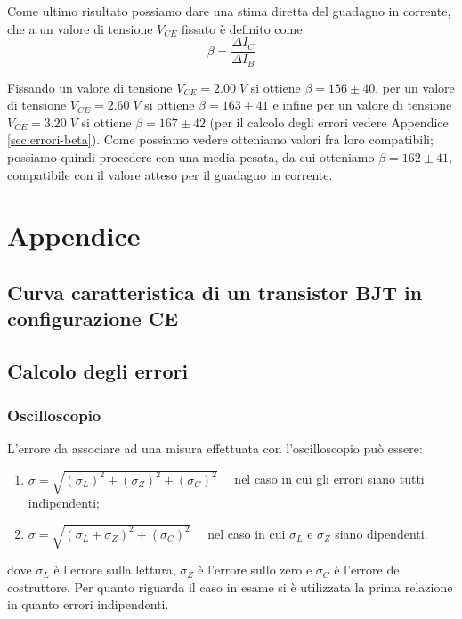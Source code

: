 \documentclass[a4paper, 11pt]{article}
\begin{document}
Come ultimo risultato possiamo dare una stima diretta del guadagno in corrente, che a un valore di tensione $V_{CE}$ fissato è definito come:
\begin{equation*}
    \beta = \frac{\Delta I_C}{\Delta I_B}
\end{equation*}

Fissando un valore di tensione $V_{CE} = 2.00 \; V$ si ottiene $\beta = 156 \pm 40$, per un valore di tensione $V_{CE} = 2.60 \; V$ si ottiene $\beta = 163 \pm 41$ e infine per un valore di tensione $V_{CE} = 3.20 \; V$ si ottiene $\beta = 167 \pm 42$ (per il calcolo degli errori vedere Appendice \ref{sec:errori-beta}). Come possiamo vedere otteniamo valori fra loro compatibili; possiamo quindi procedere con una media pesata, da cui otteniamo $\beta = 162 \pm 41$, compatibile con il valore atteso per il guadagno in corrente. 

\newpage
\section{Appendice}

\subsection{Curva caratteristica di un transistor BJT in configurazione CE} \label{sec:curva-caratteristica-transistor}


\subsection{Calcolo degli errori} \label{sec:errori}
\subsubsection{Oscilloscopio}
L'errore da associare ad una misura effettuata con l'oscilloscopio può essere:
\begin{enumerate}
    \item $\sigma = \sqrt{(\sigma_L)^2 + (\sigma_Z)^2 + (\sigma_C)^2} \quad$ nel caso in cui gli errori siano tutti indipendenti;
    \item  $\sigma = \sqrt{(\sigma_L + \sigma_Z)^2 + (\sigma_C)^2} \quad$ nel caso in cui $\sigma_L$ e $\sigma_Z$ siano dipendenti.
    \end{enumerate}
dove $\sigma_L$ è l'errore sulla lettura, $\sigma_Z$ è l'errore sullo zero e $\sigma_C$ è l'errore del costruttore. Per quanto riguarda il caso in esame si è utilizzata la prima relazione in quanto errori indipendenti.
\end{document}
